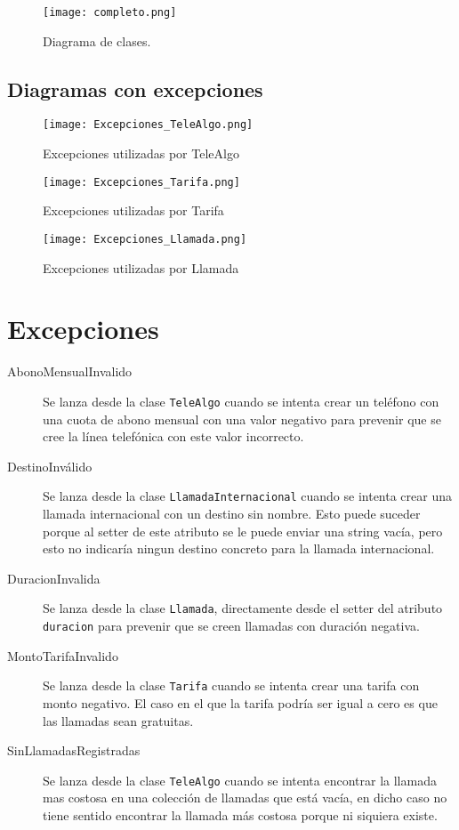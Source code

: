 \documentclass[titlepage,a4paper]{article}
\begin{document}
\begin{figure}[H]
\centering
\texttt{[image: completo.png]}
\caption{\label{fig:class01}Diagrama de clases.}
\end{figure}

\subsection{Diagramas con excepciones}

\begin{figure}[H]
\centering
\texttt{[image: Excepciones\_TeleAlgo.png]}
\caption{\label{fig:class02}Excepciones utilizadas por TeleAlgo}
\end{figure}

\begin{figure}[H]
\centering
\texttt{[image: Excepciones\_Tarifa.png]}
\caption{\label{fig:class03}Excepciones utilizadas por Tarifa}
\end{figure}

\begin{figure}[H]
\centering
\texttt{[image: Excepciones\_Llamada.png]}
\caption{\label{fig:class04}Excepciones utilizadas por Llamada}
\end{figure}



\section{Excepciones}\label{sec:excepciones}

\begin{description}
\item[AbonoMensualInvalido] Se lanza desde la clase \lstinline{TeleAlgo} cuando se intenta crear un teléfono con una cuota de abono mensual con una valor negativo para prevenir que se cree la línea telefónica con este valor incorrecto.
\item[DestinoInválido] Se lanza desde la clase \lstinline{LlamadaInternacional} cuando se intenta crear una llamada internacional con un destino sin nombre. Esto puede suceder porque al setter de este atributo se le puede enviar una string vacía, pero esto no indicaría ningun destino concreto para la llamada internacional. 
\item[DuracionInvalida] Se lanza desde la clase \lstinline{Llamada}, directamente desde el setter del atributo \lstinline{duracion} para prevenir que se creen llamadas con duración negativa.
\item[MontoTarifaInvalido] Se lanza desde la clase \lstinline{Tarifa} cuando se intenta crear una tarifa con monto negativo. El caso en el que la tarifa podría ser igual a cero es que las llamadas sean gratuitas.
\item[SinLlamadasRegistradas] Se lanza desde la clase \lstinline{TeleAlgo} cuando se intenta encontrar la llamada mas costosa en una colección de llamadas que está vacía, en dicho caso no tiene sentido encontrar la llamada más costosa porque ni siquiera existe.
\end{description}
\end{document}
